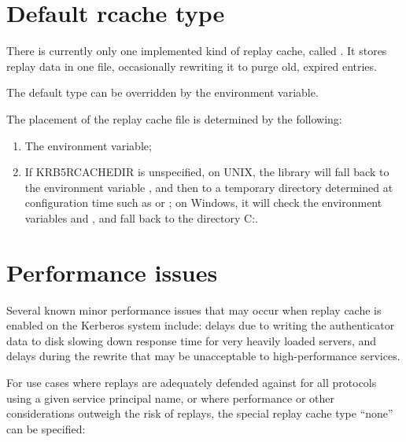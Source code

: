 \documentclass[letterpaper,10pt,english]{sphinxmanual}
\begin{document}
\section{Default rcache type}
\label{\detokenize{basic/rcache_def:default-rcache-type}}
There is currently only one implemented kind of replay cache, called
.  It stores replay data in one file, occasionally rewriting it
to purge old, expired entries.

The default type can be overridden by the 
environment variable.

The placement of the replay cache file is determined by the following:
\begin{enumerate}
\item {} 
The  environment variable;

\item {} 
If KRB5RCACHEDIR is unspecified, on UNIX, the library
will fall back to the environment variable , and then to
a temporary directory determined at configuration time such as
 or ; on Windows, it will check the environment
variables  and , and fall back to the directory C:.

\end{enumerate}


\section{Performance issues}
\label{\detokenize{basic/rcache_def:performance-issues}}
Several known minor performance issues that may occur when replay
cache is enabled on the Kerberos system include: delays due to writing
the authenticator data to disk slowing down response time for very
heavily loaded servers, and delays during the rewrite that may be
unacceptable to high-performance services.

For use cases where replays are adequately defended against for all
protocols using a given service principal name, or where performance
or other considerations outweigh the risk of replays, the special
replay cache type “none” can be specified:

%
\begin{sphinxVerbatim}[commandchars=\\\{\}]
\end{sphinxVerbatim}
\end{document}
